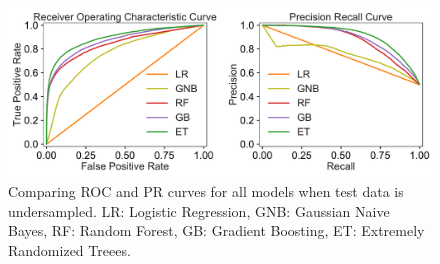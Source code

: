 \documentclass[12pt]{article}
\begin{document}
\begin{figure}[!h]
\begin{center}
\includegraphics[width=6in]{UndersampledTestDataAllModels_ROC_PR_plots.pdf}
\end{center}
\caption{\label{fig:AllModelsUndersampledTest}
Comparing ROC and PR curves for all models when test data is undersampled. LR: Logistic Regression, GNB: Gaussian Naive Bayes, RF: Random Forest, GB: Gradient Boosting, ET: Extremely Randomized Treees.}
\end{figure}
\end{document}
